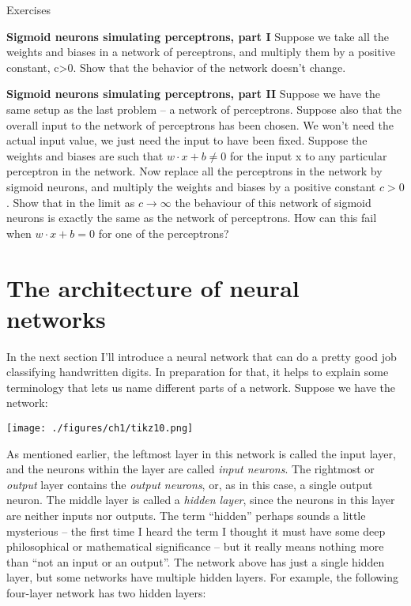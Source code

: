 \documentclass[a4paper,twoside,10pt]{book}
\begin{document}
\begin{exercize}{Exercises}
\item \textbf{Sigmoid neurons simulating perceptrons, part I} Suppose we take all the weights and biases in a network of perceptrons, and multiply them by a positive constant, c>0. Show that the behavior of the network doesn't change.

\item \textbf{Sigmoid neurons simulating perceptrons, part II} Suppose we have the same setup as the last problem -- a network of perceptrons. Suppose also that the overall input to the network of perceptrons has been chosen. We won't need the actual input value, we just need the input to have been fixed. Suppose the weights and biases are such that $w\cdot x + b \ne 0$ for the input x to any particular perceptron in the network. Now replace all the perceptrons in the network by sigmoid neurons, and multiply the weights and biases by a positive constant $c>0$. Show that in the limit as $c\to\infty$ the behaviour of this network of sigmoid neurons is exactly the same as the network of perceptrons. How can this fail when $w\cdot x+b=0$ for one of the perceptrons?
\end{exercize}

\section{The architecture of neural networks}
In the next section I'll introduce a neural network that can do a pretty good job classifying handwritten digits. In preparation for that, it helps to explain some terminology that lets us name different parts of a network. Suppose we have the network:

\begin{center}
	\texttt{[image: ./figures/ch1/tikz10.png]}
\end{center}
As mentioned earlier, the leftmost layer in this network is called the input layer, and the neurons within the layer are called \textit{input neurons}. The rightmost or \textit{output} layer contains the \textit{output neurons}, or, as in this case, a single output neuron. The middle layer is called a \textit{hidden layer}, since the neurons in this layer are neither inputs nor outputs. The term ``hidden'' perhaps sounds a little mysterious -- the first time I heard the term I thought it must have some deep philosophical or mathematical significance -- but it really means nothing more than ``not an input or an output''. The network above has just a single hidden layer, but some networks have multiple hidden layers. For example, the following four-layer network has two hidden layers:
\end{document}
